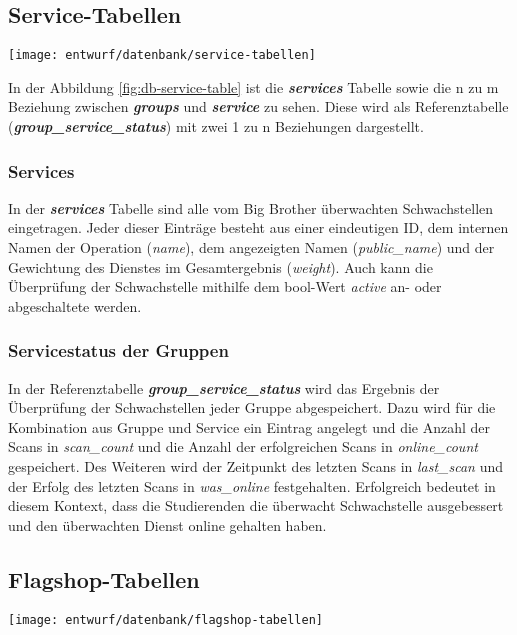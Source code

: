 \subsection{Service-Tabellen}
\begin{center}
	\texttt{[image: entwurf/datenbank/service-tabellen]}
	\label{fig:db-service-table}
\end{center}


In der Abbildung \ref{fig:db-service-table} ist die \textbf{\textit{services}} Tabelle sowie die n zu m Beziehung zwischen \textbf{\textit{groups}} und \textbf{\textit{service}} zu sehen. Diese wird als Referenztabelle (\textbf{\textit{group\_service\_status}}) mit zwei 1 zu n Beziehungen dargestellt.

\subsubsection{Services}
In der \textbf{\textit{services}} Tabelle sind alle vom Big Brother überwachten Schwachstellen eingetragen. Jeder dieser Einträge besteht aus einer eindeutigen ID, dem internen Namen der Operation (\textit{name}), dem angezeigten Namen (\textit{public\_name}) und der Gewichtung des Dienstes im Gesamtergebnis (\textit{weight}). Auch kann die Überprüfung der Schwachstelle mithilfe dem bool-Wert \textit{active} an- oder abgeschaltete werden.

\subsubsection{Servicestatus der Gruppen}
In der Referenztabelle \textbf{\textit{group\_service\_status}} wird das Ergebnis der Überprüfung der Schwachstellen jeder Gruppe abgespeichert. Dazu wird für die Kombination aus Gruppe und Service ein Eintrag angelegt und die Anzahl der Scans in \textit{scan\_count} und die Anzahl der erfolgreichen Scans in \textit{online\_count} gespeichert. Des Weiteren wird der Zeitpunkt des letzten Scans in \textit{last\_scan} und der Erfolg des letzten Scans in \textit{was\_online} festgehalten. Erfolgreich bedeutet in diesem Kontext, dass die Studierenden die überwacht Schwachstelle ausgebessert und den überwachten Dienst online gehalten haben.

\subsection{Flagshop-Tabellen}
\begin{center}
	\texttt{[image: entwurf/datenbank/flagshop-tabellen]}
	\label{fig:db-flagshop-table}
\end{center}

